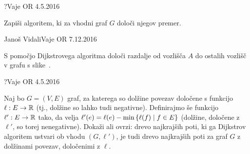 \begin{naloga}{?}{Vaje OR 4.5.2016}
\begin{vprasanje}
Zapiši algoritem, ki za vhodni graf $G$ določi njegov premer.

\end{vprasanje}
\begin{odgovor}
\end{odgovor}
\end{naloga}


\begin{naloga}{Janoš Vidali}{Vaje OR 7.12.2016}
\begin{vprasanje}[dijkstra]
S pomočjo Dijkstrovega algoritma
določi razdalje od vozlišča $A$ do ostalih vozlišč
v grafu s slike~\fig{}.

\begin{slika}
\end{slika}
\end{vprasanje}
\begin{odgovor}
\end{odgovor}
\end{naloga}

\begin{naloga}{?}{Vaje OR 4.5.2016}
\begin{vprasanje}
Naj bo $G = (V, E)$ graf,
za katerega so dolžine povezav določene s funkcijo $\ell : E \to \mathbb{R}$
(tj., dolžine so lahko tudi negativne).
Definirajmo še funkcijo $\ell' : E \to \mathbb{R}$ tako,
da velja $\ell'(e) = \ell(e) - \min\left\{ \ell(f) \; \middle| \; f \in E \right\}$
(dolžine, določene z $\ell'$, so torej nenegativne).
Dokaži ali ovrzi: drevo najkrajših poti,
ki ga Dijkstrov algoritem ustvari ob vhodu $(G, \ell')$,
je tudi drevo najkrajših poti za graf $G$ z dolžinami povezav,
določenimi z $\ell$.
\end{vprasanje}
\begin{odgovor}
\end{odgovor}
\end{naloga}



